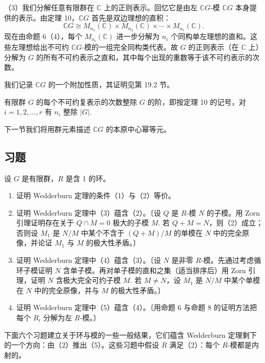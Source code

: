 （3）我们分解任意有限群在 \(\mathbb{C}\) 上的正则表示。回忆它是由左 \(\mathbb{C}G\)-模 \(\mathbb{C}G\) 本身提供的表示。由定理 10，\(\mathbb{C}G\) 首先是双边理想的直积：
\[
\mathbb{C}G \cong M_{n_1}(\mathbb{C}) \times M_{n_2}(\mathbb{C}) \times \cdots \times M_{n_r}(\mathbb{C}).
\]
现在由命题 6（4），每个 \(M_{n_i}(\mathbb{C})\) 进一步分解为 \(n_i\) 个同构单左理想的直和。这些左理想给出不可约 \(\mathbb{C}G\)-模的一组完全同构类代表。故 \(G\) 的正则表示（在 \(\mathbb{C}\) 上）分解为 \(G\) 的所有不可约表示之直和，其中每个出现的重数等于该不可约表示的次数。

我们记录 \(\mathbb{C}G\) 的一个附加性质，其证明见第 19.2 节。

\begin{theorem}\label{thm:18.12}
有限群 \(G\) 的每个不可约复表示的次数整除 \(G\) 的阶，即按定理 10 的记号，对 \(i = 1, 2, \ldots, r\) 有 \(n_i\) 整除 \(|G|\).
\end{theorem}

下一节我们将用群元素描述 \(\mathbb{C}G\) 的本原中心幂等元。

\subsection*{习题}

设 \(G\) 是有限群，\(R\) 是含 1 的环。

\begin{enumerate}
\item 证明 Wedderburn 定理的条件（1）与（2）等价。

\item 证明 Wedderburn 定理中（3）蕴含（2）。〔设 \(Q\) 是 \(R\)-模 \(N\) 的子模。用 Zorn 引理证明存在关于 \(Q \cap M = 0\) 极大的子模 \(M\). 若 \(Q+M = N\)，则（2）成立；否则设 \(M_1\) 是 \(N/M\) 中某个不含于 \((Q+M)/M\) 的单模在 \(N\) 中的完全原像，并论证 \(M_1\) 与 \(M\) 的极大性矛盾。〕

\item 证明 Wedderburn 定理中（4）蕴含（3）。〔设 \(N\) 是非零 \(R\)-模。先通过考虑循环子模证明 \(N\) 含单子模。再对单子模的直和之集（适当排序后）用 Zorn 引理，证明 \(N\) 含极大完全可约子模 \(M\). 若 \(M \neq N\)，设 \(M_1\) 是 \(N/M\) 中某个单模在 \(N\) 中的完全原像，并与 \(M\) 的极大性矛盾。〕

\item 证明 Wedderburn 定理中（5）蕴含（4）。〔用命题 6 与命题 8 的证明方法把每个 \(R_i\) 分解为左 \(R\)-模。〕
\end{enumerate}

下面六个习题建立关于环与模的一些一般结果，它们蕴含 Wedderburn 定理剩下的一个方向：由（2）推出（5）。这些习题中假设 \(R\) 满足（2）：每个 \(R\)-模都是内射的。

